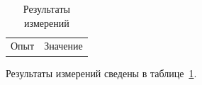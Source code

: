 \begin{table}[h] %
  \caption{Результаты измерений}
  \label{tab:results}
  \begin{tabular}{ll}
    Опыт & Значение \\
  \end{tabular}
\end{table}

Результаты измерений сведены в таблице~\ref{tab:results}.
